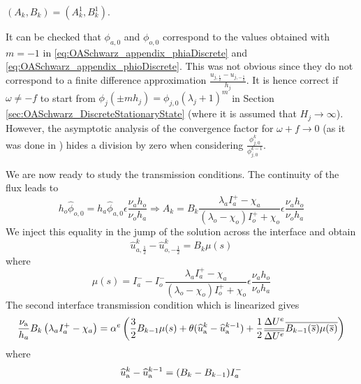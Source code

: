 $(A_k, B_k) = (A_k^1, B_k^1)$.
\begin{remark}
It can be checked that $\phi_{a,0}$ and $\phi_{o,0}$
correspond to the values obtained with
$m=-1$ in
\eqref{eq:OASchwarz_appendix_phiaDiscrete} and
\eqref{eq:OASchwarz_appendix_phioDiscrete}. This
was not obvious since they do not correspond to a finite
difference approximation $\frac{u_{j, \frac{1}{2}} -
u_{j, -\frac{1}{2}}}{h_j}$.
It is hence correct if $\omega \neq -f$ to start from
$\phi_j(\pm m h_j)= \phi_{j,0}(\lambda_j+1)^m$ in Section
\ref{sec:OASchwarz_DiscreteStationaryState}
(where it is assumed that $H_j \rightarrow \infty$).
However, the asymptotic analysis of the convergence factor
for $\omega+f\rightarrow 0$
(as it was done in \citep{clement_discrete_2021})
hides a division by zero when considering
$\frac{\phi_{j,0}^{k}}{\phi_{j,0}^{k-1}}$.
\end{remark}
We are now ready to study the transmission conditions.
The continuity of the flux leads to
\begin{equation}
    h_o \widehat{\phi}_{o,0} = h_a \widehat{\phi}_{a,0}
    \epsilon\frac{\nu_a h_o}
    {\nu_o h_a}
    \Rightarrow
	A_k = B_k \frac{\lambda_a I_a^{+} - \chi_a}
	{(\lambda_o - \chi_o)I_o^{+} + \chi_o}
    \epsilon\frac{\nu_a h_o}
    {\nu_o h_a}
\end{equation}
We inject this equality in the jump of the solution across
the interface and obtain
\begin{equation}
    \widehat{u}_{a,\frac{1}{2}}^k - \widehat{u}_{o,-\frac{1}{2}}^k
    = B_k \mu(s)
\end{equation}
where
\begin{equation}
	\mu(s) = I_a^{-} - I_o^{-}
\frac{\lambda_a I_a^{+} - \chi_a}
	{(\lambda_o - \chi_o)I_o^{+} + \chi_o}
    \epsilon\frac{\nu_a h_o}
    {\nu_o h_a}
\end{equation}
The second interface transmission condition which
is linearized gives
\begin{equation}
	\label{eq:OASchwarz_LinearizedAnalysis_relationBBarB}
\frac{\nu_{\rm a}}{h_a}B_k \left(\lambda_a I_a^{+} - \chi_a \right)
	=  \alpha^e \left(\frac{3}{2}B_{k-1} \mu(s)
+\theta ( \widehat{u}_{\rm a}^{k} -  \widehat{u}_{\rm a}^{k-1})
+ \frac{1}{2}\frac{\Delta U^e}{\overline{\Delta U^e}}
\overline{B_{k-1}(\overline{s}) \mu(\overline{s})}
\right)
\end{equation}
where
\begin{equation}
	\widehat{u}_{\rm a}^{k} -  \widehat{u}_{\rm a}^{k-1} = (B_k - B_{k-1})I_a^{-}
\end{equation}
